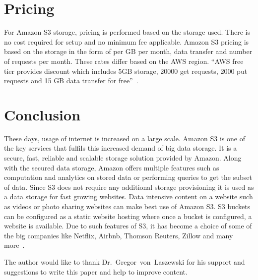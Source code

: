 \section{Pricing}

For Amazon S3 storage, pricing is performed based on the storage used. There is
no cost required for setup and no minimum fee applicable. Amazon S3 pricing is
based on the storage in the form of per GB per month, data transfer and number
of requests per month. These rates differ based on the AWS region. ``AWS free
tier provides discount which includes 5GB storage, 20000 get requests, 2000 put
requests and 15 GB data transfer for
free''~\cite{hid-sp18-420-amazon-S3-pricing}.

\section{Conclusion}
These days, usage of internet is increased on a large scale.
Amazon S3 is one of the key services that fulfils this increased demand of big
data storage. It is a secure, fast, reliable and scalable storage
solution provided by Amazon.
Along with the secured data storage, Amazon offers multiple features such as
computation and analytics on stored data or performing queries to get the
subset of data.
Since S3 does not require any additional storage provisioning it is used as a
data storage for fast growing websites. Data intensive content on a website
such as videos or photo sharing websites can make best use of Amazon S3.
S3 buckets can be configured as a static website hosting where once a bucket is
configured, a website is available.
Due to such features of S3, it has become a choice of some of the big companies
like Netflix, Airbnb, Thomson Reuters, Zillow and many
more~\cite{hid-sp18-420-amazon-S3}.

\begin{acks}

The author would like to thank Dr.~Gregor~von~Laszewski for his support and
suggestions to write this paper and help to improve content.

\end{acks}



 
